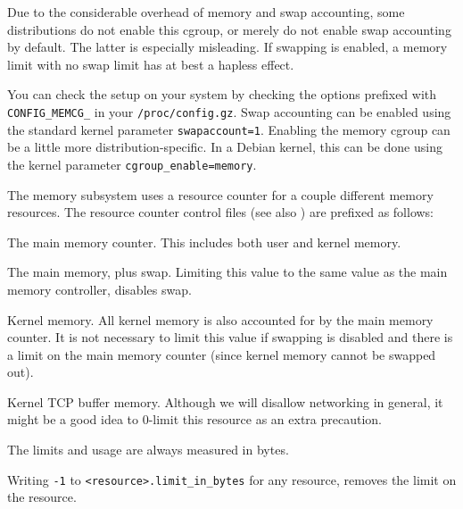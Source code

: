 Due to the considerable overhead of memory and swap accounting, some
distributions do not enable this cgroup, or merely do not enable swap
accounting by default. The latter is especially misleading. If swapping is
enabled, a memory limit with no swap limit has at best a hapless effect.

You can check the setup on your system by checking the options prefixed with
\texttt{CONFIG\_MEMCG\_} in your \texttt{/proc/config.gz}. Swap accounting can
be enabled using the standard kernel parameter
\texttt{swapaccount=1}\cite{documentation-kernel-parameters.txt}. Enabling the
memory cgroup can be a little more distribution-specific.  In a Debian
kernel, this can be done using the kernel parameter
\texttt{cgroup\_enable=memory}\cite{hutchings-2011}.

The memory subsystem uses a resource counter for a couple different memory
resources. The resource counter control files (see also
) are prefixed as follows:

\begin{description}[\setleftmargin{0.2in}\breaklabel\setlabelstyle{\tt}]

\item[memory]

The main memory counter. This includes both user and kernel memory.

\item[memory.memsw]

The main memory, plus swap. Limiting this value to the same value as the main
memory controller, disables swap.

\item[memory.kmem]

Kernel memory. All kernel memory is also accounted for by the main memory
counter. It is not necessary to limit this value if swapping is disabled and
there is a limit on the main memory counter (since kernel memory cannot be
swapped out).

\item[memory.kmem.tcp]

Kernel TCP buffer memory. Although we will disallow networking in general, it
might be a good idea to 0-limit this resource as an extra precaution.

\end{description}

The limits and usage are always measured in bytes.

Writing \texttt{-1} to \texttt{<resource>.limit\_in\_bytes} for any resource,
removes the limit on the resource.

